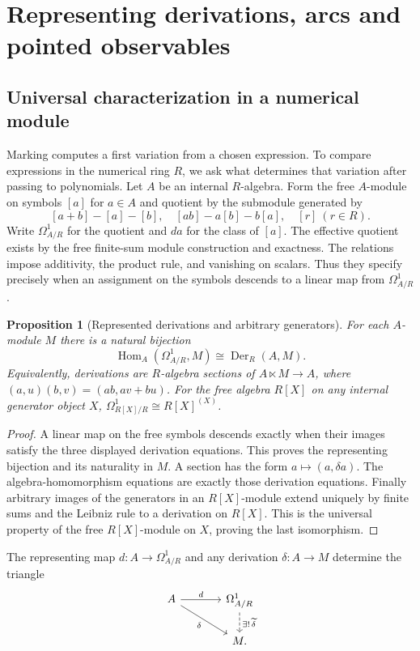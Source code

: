 \documentclass[11pt,a4paper]{article}
\newtheorem{proposition}[proposition]{Proposition}
\theoremstyle{definition}
\theoremstyle{remark}\newaliascnt{remark}{theorem}
\newcommand{\Hom}{\operatorname{Hom}}
\numberwithin{equation}{section}
\begin{document}
\section{Representing derivations, arcs and pointed observables}\label{sec:charts}

\subsection{Universal characterization in a numerical module}
Marking computes a first variation from a chosen expression. To compare expressions in the numerical ring $R$, we ask what determines that variation after passing to polynomials. Let $A$ be an internal $R$-algebra. Form the free $A$-module on symbols $[a]$ for $a\in A$ and quotient by the submodule generated by
\[
 [a+b]-[a]-[b],\quad [ab]-a[b]-b[a],\quad [r]\ (r\in R).
\]
Write $\Omega^1_{A/R}$ for the quotient and $da$ for the class of $[a]$. The effective quotient exists by the free finite-sum module construction and exactness. The relations impose additivity, the product rule, and vanishing on scalars. Thus they specify precisely when an assignment on the symbols descends to a linear map from $\Omega^1_{A/R}$ \cite[Tag 00RM]{poly:stacks-differentials}.
\begin{proposition}[Represented derivations and arbitrary generators]
\label{poly:prop:universal}
For each $A$-module $M$ there is a natural bijection
\[
 \Hom_A(\Omega^1_{A/R},M)\cong\operatorname{Der}_R(A,M).
\]
Equivalently, derivations are $R$-algebra sections of
$A\ltimes M\to A$, where
$(a,u)(b,v)=(ab,av+bu)$. For the free algebra $R[X]$ on any internal
generator object $X$,
$\Omega^1_{R[X]/R}\cong R[X]^{(X)}$.
\end{proposition}
\begin{proof}
A linear map on the free symbols descends exactly when their images
satisfy the three displayed derivation equations. This proves the
representing bijection and its naturality in $M$. A section has the
form $a\mapsto(a,\delta a)$. The algebra-homomorphism equations are
exactly those derivation equations. Finally arbitrary images of the
generators in an $R[X]$-module extend uniquely by finite sums and the
Leibniz rule to a derivation on $R[X]$. This is the universal property
of the free $R[X]$-module on $X$, proving the last isomorphism.
\end{proof}
The representing map \(d:A\to\Omega^1_{A/R}\) and any derivation \(\delta:A\to M\) determine the triangle
\[
\begin{tikzcd}[column sep=large]
 A\arrow[r,"d"]\arrow[dr,"\delta"']&\Omega^1_{A/R}\arrow[d,dashed,"{\exists!\,\widetilde\delta}"]\\
 &M .
\end{tikzcd}
\]
\end{document}
